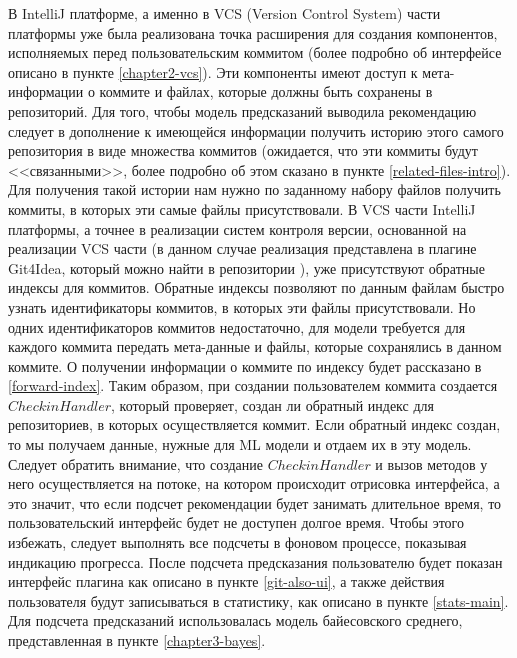 В IntelliJ платформе, а именно в VCS (Version Control System) части платформы уже была реализована точка расширения для создания компонентов, исполняемых перед пользовательским коммитом (более подробно об интерфейсе описано в пункте \ref{chapter2-vcs}). Эти компоненты имеют доступ к мета-информации о коммите и файлах, которые должны быть сохранены в репозиторий. Для того, чтобы модель предсказаний выводила рекомендацию следует в дополнение к имеющейся информации получить историю этого самого репозитория в виде множества коммитов (ожидается, что эти коммиты будут <<связанными>>, более подробно об этом сказано в пункте \ref{related-files-intro}). Для получения такой истории нам нужно по заданному набору файлов получить коммиты, в которых эти самые файлы присутствовали. В VCS части IntelliJ платформы, а точнее в реализации систем контроля версии, основанной на реализации VCS части (в данном случае реализация представлена в плагине Git4Idea, который можно найти в репозитории \cite{ij-community}), уже присутствуют обратные индексы для коммитов. Обратные индексы позволяют по данным файлам быстро узнать идентификаторы коммитов, в которых эти файлы присутствовали. Но одних идентификаторов коммитов недостаточно, для модели требуется для каждого коммита передать мета-данные и файлы, которые сохранялись в данном коммите. О получении информации о коммите по индексу будет рассказано в \ref{forward-index}. Таким образом, при создании пользователем коммита создается $CheckinHandler$, который проверяет, создан ли обратный индекс для репозиториев, в которых осуществляется коммит. Если обратный индекс создан, то мы получаем данные, нужные для ML модели и отдаем их в эту модель. Следует обратить внимание, что создание $CheckinHandler$ и вызов методов у него осуществляется на потоке, на котором происходит отрисовка интерфейса, а это значит, что если подсчет рекомендации будет занимать длительное время, то пользовательский интерфейс будет не доступен долгое время. Чтобы этого избежать, следует выполнять все подсчеты в фоновом процессе, показывая индикацию прогресса. После подсчета предсказания пользователю будет показан интерфейс плагина как описано в пункте \ref{git-also-ui}, а также действия пользователя будут записываться в статистику, как описано в пункте \ref{stats-main}. Для подсчета предсказаний использовалась модель байесовского среднего, представленная в пункте \ref{chapter3-bayes}.
